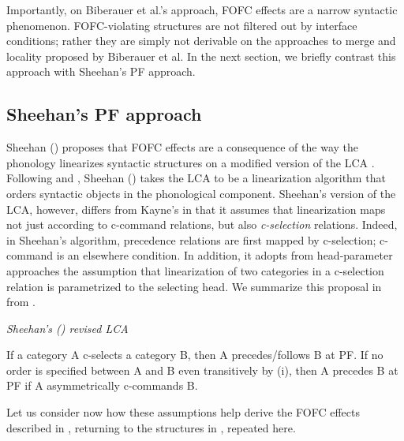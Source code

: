 \documentclass[output=paper]{langscibook}
\begin{document}
Importantly, on Biberauer et al.'s approach, FOFC effects are a narrow syntactic phenomenon. FOFC-violating structures are not filtered out by interface conditions; rather they are simply not derivable on the approaches to merge and locality proposed by Biberauer et al.  In the next section, we briefly contrast this approach with Sheehan's PF approach.
	
\subsection{Sheehan's PF approach} \protect\label{sheehanpf}
Sheehan (\citeyear{Sheehan2013fofc, sheehan2013some, sheehan2012fofchff}) proposes that FOFC effects are a consequence of the way the phonology linearizes syntactic structures on a modified version of the LCA \citep{Kayne1994}.   Following \citet{Chomsky1995} and \citet{Nunes2004}, Sheehan (\citeyear{Sheehan2013fofc,sheehan2013some}) takes the LCA to be a linearization algorithm that orders syntactic objects in the phonological component. Sheehan's version of the LCA, however, differs from Kayne's in that it assumes that  linearization maps not just according to c-command relations, but also \textit{c-selection} relations.  Indeed, in Sheehan's algorithm, precedence relations are first mapped by c-selection; c-command is an elsewhere condition.  In addition, it adopts from head-parameter approaches the assumption that linearization of two categories in a c-selection relation is parametrized to the selecting head.  We summarize this proposal in  from \cite{Sheehan2013fofc, sheehan2013some}.

\ea\label{ex:haddican:11} \textit{Sheehan's (\citeyear{sheehan2013some})
revised LCA}  \protect\label{lca}
 \begin{xlisti}
 \ex \label{ex:haddican:11i} If a category A c-selects a category B, then A precedes/follows B at PF.
 \ex \label{ex:haddican:11ii} If no order is specified between A and B even transitively by (i), then A precedes B at PF if A asymmetrically c-commands B.	
 \end{xlisti}
\z 	

Let us consider now how these assumptions help derive the FOFC effects described in , returning to the structures in , repeated here.
\end{document}
